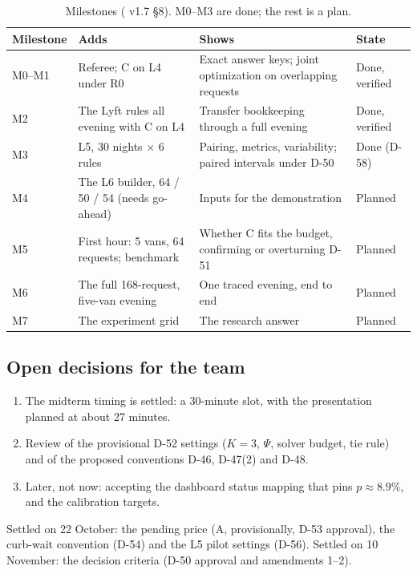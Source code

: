 \documentclass[11pt,letterpaper]{article}
\DeclareRobustCommand{\fn}[1]{\texttt{\detokenize{#1}}}
\newcommand{\D}[1]{D-#1}
\begin{document}
\begin{table}[H]
\centering\small
\caption{Milestones (\fn{scenario_methodology.md} v1.7 §8). M0--M3 are done; the rest is a plan.}\label{tab:milestones}
\begin{tabularx}{\textwidth}{@{}P{1.6cm}LLP{1.9cm}@{}}
\toprule
\textbf{Milestone} & \textbf{Adds} & \textbf{Shows} & \textbf{State}\\
\midrule
M0--M1 & Referee; C on L4 under R0 & Exact answer keys; joint optimization on overlapping requests & Done, verified\\
M2 & The Lyft rules all evening with C on L4 & Transfer bookkeeping through a full evening & Done, verified\\
M3 & L5, 30 nights $\times$ 6 rules & Pairing, metrics, variability; paired intervals under \D{50} & Done (\D{58})\\
M4 & The L6 builder, 64 / 50 / 54 (needs go-ahead) & Inputs for the demonstration & Planned\\
M5 & First hour: 5 vans, 64 requests; benchmark & Whether C fits the budget, confirming or overturning \D{51} & Planned\\
M6 & The full 168-request, five-van evening & One traced evening, end to end & Planned\\
M7 & The experiment grid & The research answer & Planned\\
\bottomrule
\end{tabularx}
\end{table}

\subsection{Open decisions for the team}
\begin{enumerate}
\item The midterm timing is settled: a 30-minute slot, with the presentation planned at about 27 minutes.
\item Review of the provisional \D{52} settings ($K = 3$, $\Psi$, solver budget, tie rule) and of the proposed conventions \D{46}, \D{47}(2) and \D{48}.
\item Later, not now: accepting the dashboard status mapping that pins $p \approx 8.9\%$, and the calibration targets.
\end{enumerate}
Settled on 22 October: the pending price (A, provisionally, \D{53} approval), the curb-wait convention (\D{54}) and the L5 pilot settings (\D{56}). Settled on 10 November: the decision criteria (\D{50} approval and amendments 1--2).
\end{document}
